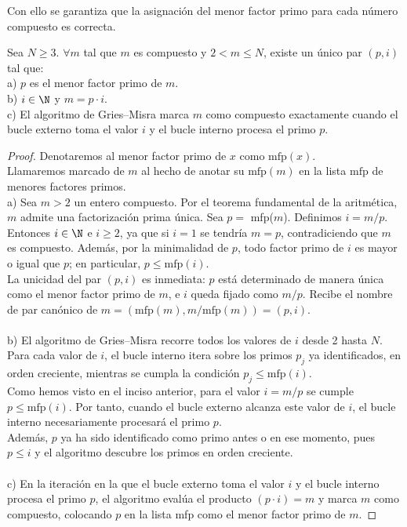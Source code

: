 Con ello se garantiza que la asignación del menor factor primo para cada número compuesto es correcta. \\

\begin{enunciado}\label{enun:compuestoUnico}\leavevmode\par
Sea $ N \geq 3$. $\forall m$ tal que $m$ es compuesto y $2 < m \leq N$, existe un único par $(p,i)$ tal que: \\
a) $p$ es el menor factor primo de $m$. \\
b) $i \in \N$ y $m = p \cdot i$. \\
c) El algoritmo de Gries–Misra marca $m$ como compuesto exactamente cuando el bucle externo toma el valor $i$ y el bucle interno procesa el primo $p$.
\end{enunciado}

\begin{proof} Denotaremos al menor factor primo de $x$ como $\mathrm{mfp}(x)$. \\
Llamaremos marcado de $m$ al hecho de anotar su $\mathrm{mfp}(m)$ en la lista $\mathrm{mfp}$ de menores factores primos. \\
a) Sea $m > 2$ un entero compuesto. Por el teorema fundamental de la aritmética, $m$ admite una factorización prima única. Sea $p =$ mfp($m$). Definimos $i = m / p$.\\
Entonces $i \in \N$ e $i \geq 2$, ya que si $i = 1$ se tendría $m = p$, contradiciendo que $m$ es compuesto.
Además, por la minimalidad de $p$, todo factor primo de $i$ es mayor o igual que $p$; en particular, $p \leq \mathrm{mfp}(i)$. \\
La unicidad del par $(p,i)$ es inmediata: $p$ está determinado de manera única como el menor factor primo de $m$, e $i$ queda fijado como $m/p$. Recibe el nombre de par canónico de $m = (\mathrm{mfp}(m),m / \mathrm{mfp}(m)) = (p,i)$. \\ \\
b) El algoritmo de Gries–Misra recorre todos los valores de $i$ desde 2 hasta $N$. \\
Para cada valor de $i$, el bucle interno itera sobre los primos $p_j$ ya identificados, en orden creciente, mientras se cumpla la condición $p_j \leq \mathrm{mfp}(i)$. \\
Como hemos visto en el inciso anterior, para el valor $i = m / p$ se cumple $p \leq \mathrm{mfp}(i)$. Por tanto, cuando el bucle externo alcanza este valor de $i$, el bucle interno necesariamente procesará el primo $p$. \\
Además, $p$ ya ha sido identificado como primo antes o en ese momento, pues $p \leq i$ y el algoritmo descubre los primos en orden creciente. \\ \\
c) En la iteración en la que el bucle externo toma el valor $i$ y el bucle interno procesa el primo $p$, el algoritmo evalúa el producto $(p \cdot i) = m$ y marca $m$ como compuesto, colocando $p$ en la lista mfp como el menor factor primo de $m$.
\end{proof}

